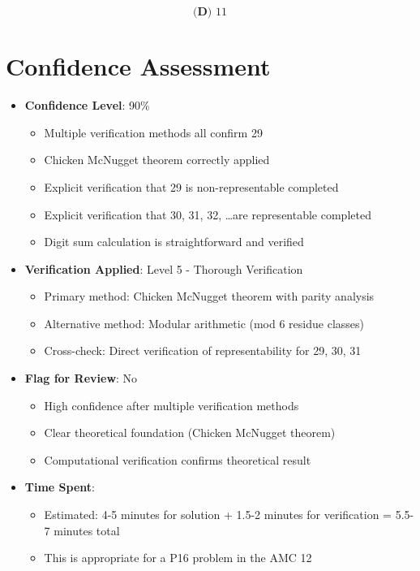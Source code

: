 \documentclass[12pt]{article}
\begin{document}
$$\boxed{\textbf{(D) } 11}$$

\section*{Confidence Assessment}
\begin{itemize}[leftmargin=*]
    \item \textbf{Confidence Level}: 90\% 
    \begin{itemize}
        \item Multiple verification methods all confirm 29
        \item Chicken McNugget theorem correctly applied
        \item Explicit verification that 29 is non-representable completed
        \item Explicit verification that 30, 31, 32, \ldots are representable completed
        \item Digit sum calculation is straightforward and verified
    \end{itemize}
    \item \textbf{Verification Applied}: Level 5 - Thorough Verification
    \begin{itemize}
        \item Primary method: Chicken McNugget theorem with parity analysis
        \item Alternative method: Modular arithmetic (mod 6 residue classes)
        \item Cross-check: Direct verification of representability for 29, 30, 31
    \end{itemize}
    \item \textbf{Flag for Review}: No
    \begin{itemize}
        \item High confidence after multiple verification methods
        \item Clear theoretical foundation (Chicken McNugget theorem)
        \item Computational verification confirms theoretical result
    \end{itemize}
    \item \textbf{Time Spent}: 
    \begin{itemize}
        \item Estimated: 4-5 minutes for solution + 1.5-2 minutes for verification = 5.5-7 minutes total
        \item This is appropriate for a P16 problem in the AMC 12
    \end{itemize}
\end{itemize}
\end{document}
